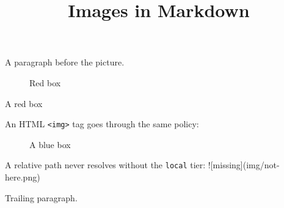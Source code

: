 \documentclass[11pt,a4paper]{article}
\title{Images in Markdown}
\begin{document}
\maketitle

A paragraph before the picture.

\begin{figure}[h]
\caption{Red box}
\end{figure}

A red box

An HTML \texttt{<img>} tag goes through the same policy:

\begin{figure}[h]
\caption{A blue box}
\end{figure}

A relative path never resolves without the \texttt{local} tier: ![missing](img/not-here.png)

Trailing paragraph.
\end{document}
